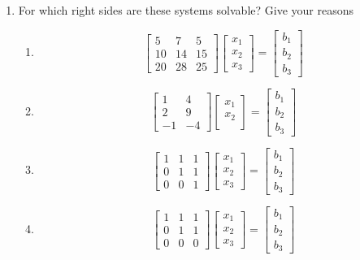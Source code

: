 \documentclass[a4paper, 11pt]{article}
\begin{document}
\begin{enumerate}
\item For which right sides are these systems solvable? Give your reasons
\begin{enumerate}
\item
\[ 
\left[ \begin{array}{ccc}
5  &   7 &  5\\
10  &   14 &  15\\
20 & 28 & 25
\end{array} \right]
%
\left[ \begin{array}{c}
 x_1\\
 x_2\\
x_3 
\end{array} \right]
%
= \left[ \begin{array}{c}
 b_1\\
 b_2\\
 b_3 
\end{array} \right]
\]
\item
\[ 
\left[ \begin{array}{cc}
1  &   4 \\
2  &  9 \\
-1 & -4 
\end{array} \right]
%
\left[ \begin{array}{c}
 x_1\\
 x_2\\
\end{array} \right]
%
= \left[ \begin{array}{c}
 b_1\\
 b_2\\
 b_3 
\end{array} \right]
\]
\item 
\[ 
\left[ \begin{array}{ccc}
1  & 1 & 1\\
0  & 1 & 1\\
0 & 0 & 1
\end{array} \right]
%
\left[ \begin{array}{c}
 x_1\\
 x_2\\
x_3
\end{array} \right]
%
= \left[ \begin{array}{c}
 b_1\\
 b_2\\
 b_3 
\end{array} \right]
\]
\item
\[
 \left[ \begin{array}{ccc}
1  & 1 & 1\\
0  & 1 & 1\\
0 & 0 & 0
\end{array} \right]
%
\left[ \begin{array}{c}
 x_1\\
 x_2\\
x_3
\end{array} \right]
%
= \left[ \begin{array}{c}
 b_1\\
 b_2\\
 b_3 
\end{array} \right]
\]


\end{enumerate}
\end{enumerate}
\end{document}
